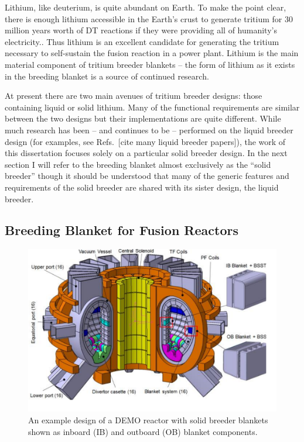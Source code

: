 Lithium, like deuterium, is quite abundant on Earth. To make the point clear, there is enough lithium accessible in the Earth's crust to generate tritium for 30 million years worth of DT reactions if they were providing all of humanity's electricity.\cite{Chen2011}. Thus lithium is an excellent candidate for generating the tritium necessary to self-sustain the fusion reaction in a power plant. Lithium is the main material component of tritium breeder blankets -- the form of lithium as it exists in the breeding blanket is a source of continued research.

At present there are two main avenues of tritium breeder designs: those containing liquid or solid lithium. Many of the functional requirements are similar between the two designs but their implementations are quite different. While much research has been -- and continues to be -- performed on the liquid breeder design (for examples, see Refs.~[cite many liquid breeder papers]), the work of this dissertation focuses solely on a particular solid breeder design. In the next section I will refer to the breeding blanket almost exclusively as the ``solid breeder'' though it should be understood that many of the generic features and requirements of the solid breeder are shared with its sister design, the liquid breeder.

\subsection{Breeding Blanket for Fusion Reactors}


\begin{figure}[ht]
	\centering
	\includegraphics[width=1\textwidth]{chapters/figures/demo} 
	\caption{An example design of a DEMO reactor with solid breeder blankets shown as inboard (IB) and outboard (OB) blanket components.}
	\label{fig:demo}
\end{figure}

